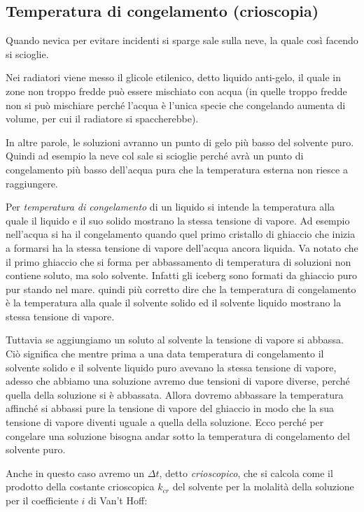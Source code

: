 \subsection{Temperatura di congelamento (crioscopia)}
Quando nevica per evitare incidenti si sparge sale sulla neve, la quale così facendo si scioglie.

Nei radiatori viene messo il glicole etilenico, detto liquido anti-gelo, il quale in zone non troppo fredde può essere mischiato con acqua (in quelle troppo fredde non si può mischiare perché l'acqua è l'unica specie che congelando aumenta di volume, per cui il radiatore si spaccherebbe).

In altre parole, le soluzioni avranno un punto di gelo più basso del solvente puro. Quindi ad esempio la neve col sale si scioglie perché avrà un punto di congelamento più basso dell'acqua pura che la temperatura esterna non riesce a raggiungere.

Per \textit{temperatura di congelamento} di un liquido si intende la temperatura alla quale il liquido e il suo solido mostrano la stessa tensione di vapore. Ad esempio nell'acqua si ha il congelamento quando quel primo cristallo di ghiaccio che inizia a formarsi ha la stessa tensione di vapore dell'acqua ancora liquida. Va notato che il primo ghiaccio che si forma per abbassamento di temperatura di soluzioni non contiene soluto, ma solo solvente. Infatti gli iceberg sono formati da ghiaccio puro pur stando nel mare. \E quindi più corretto dire che la temperatura di congelamento è la temperatura alla quale il solvente solido ed il solvente liquido mostrano la stessa tensione di vapore.

Tuttavia se aggiungiamo un soluto al solvente la tensione di vapore si abbassa. Ciò significa che mentre prima a una data temperatura di congelamento il solvente solido e il solvente liquido puro avevano la stessa tensione di vapore, adesso che abbiamo una soluzione avremo due tensioni di vapore diverse, perché quella della soluzione si è abbassata. Allora dovremo abbassare la temperatura affinché si abbassi pure la tensione di vapore del ghiaccio in modo che la sua tensione di vapore diventi uguale a quella della soluzione. Ecco perché per congelare una soluzione bisogna andar sotto la temperatura di congelamento del solvente puro.

Anche in questo caso avremo un $\Delta t$, detto \textit{crioscopico}, che si calcola come il prodotto della costante crioscopica $k_{cr}$ del solvente per la molalità della soluzione per il coefficiente $i$ di Van't Hoff:

